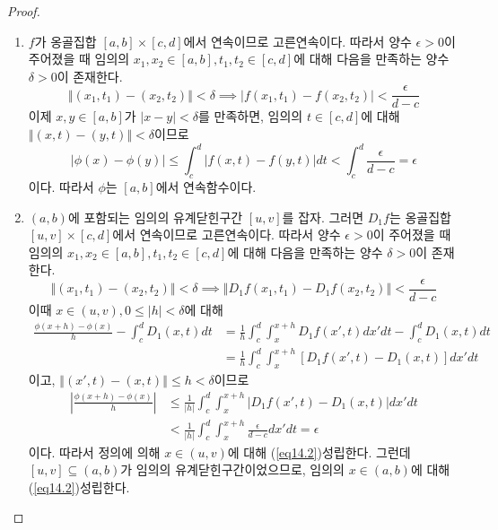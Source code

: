 \documentclass[11pt]{book}
\numberwithin{equation}{chapter}
\def\eps{\epsilon}
\newcommand{\abs}[1]{\left\vert#1\right\vert}
\newcommand{\norm}[1]{\left\Vert#1\right\Vert}
\theoremstyle{definition}
\newenvironment{enum}
	{\begin{enumerate}[label=(\alph*), leftmargin=2\parindent]}
	{\end{enumerate}}
\begin{document}
\begin{proof}
    \quad

    \begin{enum}
        \item \(f\)가 옹골집합 \([a, b] \times [c, d]\)에서 연속이므로 고른연속이다. 따라서 양수 \(\eps > 0\)이 주어졌을 때 임의의 \(x_1, x_2 \in [a, b], t_1, t_2 \in [c, d]\)에 대해 다음을 만족하는 양수 \(\delta > 0\)이 존재한다.
        \[
        \norm{(x_1, t_1) - (x_2, t_2)} < \delta \implies \abs{f(x_1, t_1) - f(x_2, t_2)} < \frac{\eps}{d - c}
        \]
        이제 \(x, y \in [a, b]\)가 \(\abs{x - y} < \delta\)를 만족하면, 임의의 \(t \in [c, d]\)에 대해 \(\norm{(x, t) - (y, t)} < \delta\)이므로
        \[
        \abs{\phi(x) - \phi(y)} \le \int_c^d \abs{f(x, t) - f(y, t)} dt < \int_c^d \frac{\eps}{d - c} = \eps    
        \]
        이다. 따라서 \(\phi\)는 \([a, b]\)에서 연속함수이다.
        \item \((a, b)\)에 포함되는 임의의 유계닫힌구간 \([u, v]\)를 잡자. 그러면 \(D_1f\)는 옹골집합 \([u, v] \times [c, d]\)에서 연속이므로 고른연속이다. 따라서 양수 \(\eps > 0\)이 주어졌을 때 임의의 \(x_1, x_2 \in [a, b], t_1, t_2 \in [c, d]\)에 대해 다음을 만족하는 양수 \(\delta > 0\)이 존재한다.
        \[
        \norm{(x_1, t_1) - (x_2, t_2)} < \delta \implies \norm{D_1f(x_1, t_1) - D_1f(x_2, t_2)} < \frac{\eps}{d-c}    
        \]
        이때 \(x \in (u, v), 0 \le \abs{h} < \delta\)에 대해
        \begin{align*}
            \frac{\phi(x+h) - \phi(x)}{h} - \int_c^d D_1(x, t)dt &= \frac{1}{h} \int_c^d \int_x^{x+h} D_1f(x', t) dx' dt - \int_c^d D_1(x, t)dt\\
            &= \frac{1}{h} \int_c^d \int_x^{x+h} [D_1f(x', t) - D_1(x, t)] dx' dt
        \end{align*}
        이고, \(\norm{(x', t) - (x, t)} \le h < \delta\)이므로
        \begin{align*}
            \abs{\frac{\phi(x+h) - \phi(x)}{h}} &\le \frac{1}{\abs{h}} \int_c^d \int_x^{x+h} \abs{D_1f(x', t) - D_1(x, t)} dx'dt\\
            &< \frac{1}{\abs{h}} \int_c^d \int_x^{x+h} \frac{\eps}{d-c} dx'dt = \eps   
        \end{align*}
        이다. 따라서 정의에 의해 \(x \in (u, v)\)에 대해 (\ref{eq14.2})\가 성립한다. 그런데 \([u, v] \subseteq (a, b)\)가 임의의 유계닫힌구간이었으므로, 임의의 \(x \in (a, b)\)에 대해 (\ref{eq14.2})\가 성립한다.
    \end{enum}
\end{proof}
\end{document}
